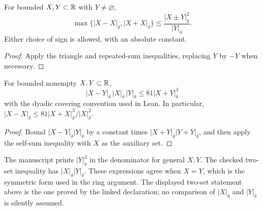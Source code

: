 \begin{corollary}
\label{cor:ruzsa-self}
\leanok
For bounded $X,Y\subset\mathbb{R}$ with $Y\ne\varnothing$,
\[
 \max\{|X-X|_\delta,|X+X|_\delta\}
                 \lesssim\frac{|X\pm Y|_\delta^2}{|Y|_\delta}.
\]
Either choice of sign is allowed, with an absolute constant.
\end{corollary}
\begin{proof}
\leanok
Apply the triangle and repeated-sum inequalities, replacing $Y$ by
$-Y$ when necessary.
\end{proof}

\begin{corollary}
\label{cor:sum-difference}
\leanok
For bounded nonempty $X,Y\subset\mathbb{R}$,
\[
  |X-Y|_\delta\,|X|_\delta\,|Y|_\delta
                              \leq81|X+Y|_\delta^3
\]
with the dyadic covering convention used in Lean. In particular,
$|X-X|_\delta\leq81|X+X|_\delta^3/|X|_\delta^2$.
\end{corollary}
\begin{proof}
\leanok
Bound $|X-Y|_\delta|Y|_\delta$ by a constant times
$|X+Y|_\delta|Y+Y|_\delta$, and then apply the self-sum inequality
with $X$ as the auxiliary set.
\end{proof}

\begin{remark}
\label{rem:ruzsa-denominator}
The manuscript prints $|Y|_\delta^2$ in the denominator for general
$X,Y$. The checked two-set inequality has
$|X|_\delta|Y|_\delta$. These expressions agree when $X=Y$, which
is the symmetric form used in the ring argument. The displayed
two-set statement above is the one proved by the linked declaration;
no comparison of $|X|_\delta$ and $|Y|_\delta$ is silently assumed.
\end{remark}

